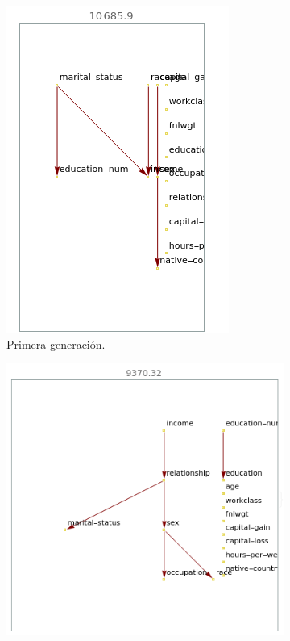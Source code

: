 \documentclass[10pt,a4paper]{article}
\begin{document}
\begin{figure}[htb!]
\begin{subfigure}[b]{0.475\textwidth}
            \includegraphics[width=\textwidth]{img/adult/first.png}
            \caption[ ]{{Primera generación.}}
        \end{subfigure}
        \hfill
        \begin{subfigure}[b]{0.475\textwidth}
            \centering 
            \includegraphics[width=\textwidth]{img/adult/best_73.png}

\end{subfigure}
\end{figure}
\end{document}

